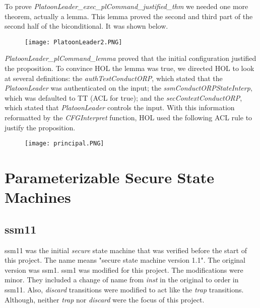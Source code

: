  To prove \textit{PlatoonLeader_exec_plCommand_justified_thm} we needed one more theorem,
  actually a lemma.  This lemma proved the second and third part of the second half of the biconditional.
  It was shown below.\\
  
  \begin{figure}[h]
  \centering
  \texttt{[image: PlatoonLeader2.PNG]}
\end{figure}

 \textit{PlatoonLeader_plCommand_lemma} proved that the initial configuration justified the
  proposition.  To convince HOL the lemma was true, we directed HOL to look at several definitions:
  the \textit{authTestConductORP}, which stated that the \textit{PlatoonLeader} was authenticated
  on the input; the \textit{ssmConductORPStateInterp}, which was defaulted to TT (ACL for true);
  and the \textit{secContextConductORP}, which stated that \textit{PlatoonLeader} controls the input.
  With this information reformatted by the \textit{CFGInterpret} function, HOL used the following
  ACL rule to justify the proposition.\\
  
  \begin{figure}[h]
  \centering
  \texttt{[image: principal.PNG]}
\end{figure}



\section{Parameterizable Secure State Machines}
\label{sec:param-secure-state}


\subsection{ssm11}
\label{sec:ssm11-1}

 ssm11 was the initial \textit{secure} state machine that was verified before the
  start of this project.  The name means "secure state machine version 1.1".  The original
  version was ssm1.  ssm1 was modified for this project.  The modifications were minor.
  They included a change of name from \textit{inst} in the original to order in ssm11.
  Also, \textit{discard} transitions were modified to act like the \textit{trap} transitions.
  Although, neither \textit{trap} nor \textit{discard} were the focus of this project.\\
  
